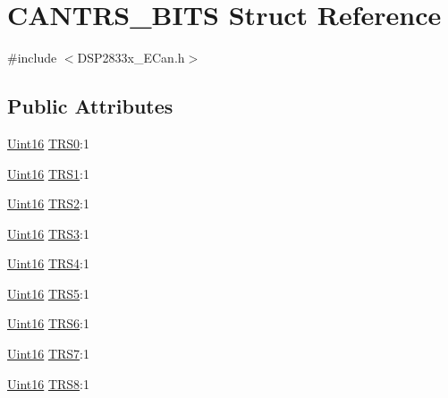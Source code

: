 \hypertarget{struct_c_a_n_t_r_s___b_i_t_s}{}\section{C\+A\+N\+T\+R\+S\+\_\+\+B\+I\+T\+S Struct Reference}
\label{struct_c_a_n_t_r_s___b_i_t_s}


{\ttfamily \#include $<$D\+S\+P2833x\+\_\+\+E\+Can.\+h$>$}

\subsection*{Public Attributes}
\begin{DoxyCompactItemize}
\item 
\hyperlink{_d_s_p2833x___device_8h_a59a9f6be4562c327cbfb4f7e8e18f08b}{Uint16} \hyperlink{struct_c_a_n_t_r_s___b_i_t_s_ae9c884736b64b12176fc0d692aa35185}{T\+R\+S0}\+:1
\item 
\hyperlink{_d_s_p2833x___device_8h_a59a9f6be4562c327cbfb4f7e8e18f08b}{Uint16} \hyperlink{struct_c_a_n_t_r_s___b_i_t_s_a8f82c1b9ad3a9b2f7ba17c4ed1fae7b5}{T\+R\+S1}\+:1
\item 
\hyperlink{_d_s_p2833x___device_8h_a59a9f6be4562c327cbfb4f7e8e18f08b}{Uint16} \hyperlink{struct_c_a_n_t_r_s___b_i_t_s_ac1472bea30c67f99088cefc3ac121fc5}{T\+R\+S2}\+:1
\item 
\hyperlink{_d_s_p2833x___device_8h_a59a9f6be4562c327cbfb4f7e8e18f08b}{Uint16} \hyperlink{struct_c_a_n_t_r_s___b_i_t_s_a29be2e7f2914f2a907e3b9a39a7b178a}{T\+R\+S3}\+:1
\item 
\hyperlink{_d_s_p2833x___device_8h_a59a9f6be4562c327cbfb4f7e8e18f08b}{Uint16} \hyperlink{struct_c_a_n_t_r_s___b_i_t_s_a0817ec176329eb42cc088b3fed15a6bc}{T\+R\+S4}\+:1
\item 
\hyperlink{_d_s_p2833x___device_8h_a59a9f6be4562c327cbfb4f7e8e18f08b}{Uint16} \hyperlink{struct_c_a_n_t_r_s___b_i_t_s_abe1c679eb27e2c4c02dff3924de0ea36}{T\+R\+S5}\+:1
\item 
\hyperlink{_d_s_p2833x___device_8h_a59a9f6be4562c327cbfb4f7e8e18f08b}{Uint16} \hyperlink{struct_c_a_n_t_r_s___b_i_t_s_a84b8810c35b3a9801350b38a8bdf4c99}{T\+R\+S6}\+:1
\item 
\hyperlink{_d_s_p2833x___device_8h_a59a9f6be4562c327cbfb4f7e8e18f08b}{Uint16} \hyperlink{struct_c_a_n_t_r_s___b_i_t_s_a31e233b5e7e783cd054f0ee2338cfed8}{T\+R\+S7}\+:1
\item 
\hyperlink{_d_s_p2833x___device_8h_a59a9f6be4562c327cbfb4f7e8e18f08b}{Uint16} \hyperlink{struct_c_a_n_t_r_s___b_i_t_s_af67989cfe42f228b8fe5e1c2eb83413f}{T\+R\+S8}\+:1

\end{DoxyCompactItemize}
